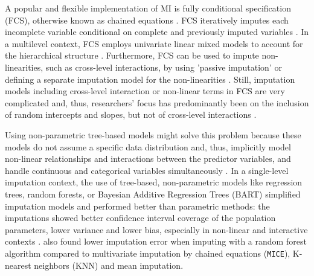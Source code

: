 \documentclass[10pt, a4paper, titlepage]{article}
\begin{document}
A popular and flexible implementation of MI is fully conditional specification (FCS), otherwise known as chained equations \citep{audigier2018, burgette2010, vanbuuren2007, grund2018a}. FCS iteratively imputes each incomplete variable conditional on complete and previously imputed variables \citep{mistlerComparisonJointModel2017, buurenFlexibleImputationMissing2018, enders2016, enders2018, enders2018a, hughes2014, grund2018a}. In a multilevel context, FCS employs univariate linear mixed models to account for the hierarchical structure \citep{mistlerComparisonJointModel2017, enders2018, resche-rigon2018}. Furthermore, FCS can be used to impute non-linearities, such as cross-level interactions, by using 'passive imputation' or defining a separate imputation model for the non-linearities \citep{buurenFlexibleImputationMissing2018, grund2018}. Still, imputation models including cross-level interaction or non-linear terms in FCS are very complicated \citep{grund2021, grund2018} and, thus, researchers' focus has predominantly been on the inclusion of random intercepts and slopes, but not of cross-level interactions \citep{grund2018a, grund2016, enders2018, enders2018a, enders2020, enders2016}.

Using non-parametric tree-based models might solve this problem because these models do not assume a specific data distribution and, thus, implicitly model non-linear relationships and interactions between the predictor variables, and handle continuous and categorical variables simultaneously \citep{hill2020, burgette2010, lin2019, chipman2010, james2021, salditt2023, breiman1984}. In a single-level imputation context, the use of tree-based, non-parametric models like regression trees, random forests, or Bayesian Additive Regression Trees (BART) simplified imputation models and performed better than parametric methods: the imputations showed better confidence interval coverage of the population parameters, lower variance and lower bias, especially in non-linear and interactive contexts \citep{burgette2010, xu2016, silva2022}. \citet{waljee2013} also found lower imputation error when imputing with a random forest algorithm compared to multivariate imputation by chained equations (\texttt{MICE}), K-nearest neighbors (KNN) and mean imputation.
\end{document}
